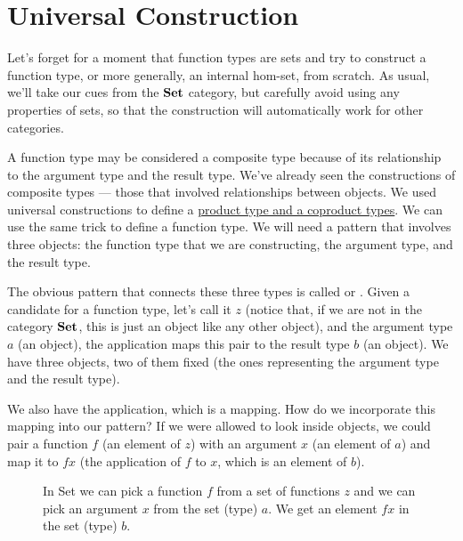 \section{Universal Construction}\label{universal-construction}

Let's forget for a moment that function types are sets and try to
construct a function type, or more generally, an internal hom-set, from
scratch. As usual, we'll take our cues from the $\mathbf{Set}$ category,
but carefully avoid using any properties of sets, so that the
construction will automatically work for other categories.

A function type may be considered a composite type because of its
relationship to the argument type and the result type. We've already
seen the constructions of composite types --- those that involved
relationships between objects. We used universal constructions to define
a \hyperref[products-and-coproducts]{product
type and a coproduct types}. We can use the same trick to define a
function type. We will need a pattern that involves three objects: the
function type that we are constructing, the argument type, and the
result type.

The obvious pattern that connects these three types is called
 or . Given a candidate for
a function type, let's call it $z$ (notice that, if we are not in
the category $\mathbf{Set}$, this is just an object like any other
object), and the argument type $a$ (an object), the application
maps this pair to the result type $b$ (an object). We have three
objects, two of them fixed (the ones representing the argument type and
the result type).

We also have the application, which is a mapping. How do we incorporate
this mapping into our pattern? If we were allowed to look inside
objects, we could pair a function $f$ (an element of $z$)
with an argument $x$ (an element of $a$) and map it to
$f x$ (the application of $f$ to $x$, which is an
element of $b$).

\begin{figure}
\centering
{}
\caption{In Set we can pick a function $f$ from a set of functions $z$ and we can
pick an argument $x$ from the set (type) $a$. We get an element $f x$ in the
set (type) $b$.}
\end{figure}

